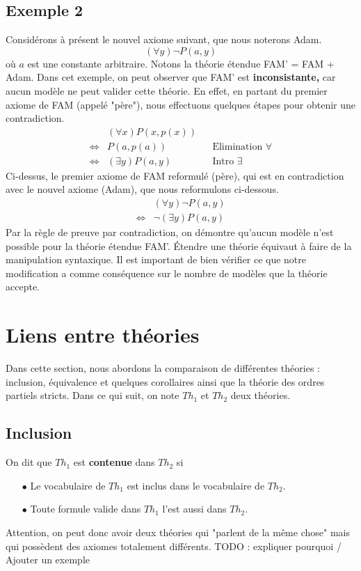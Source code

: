 \subsection*{Exemple 2}
Considérons à présent le nouvel axiome suivant, que nous noterons Adam.
$$ (\forall y) \neg P(a,y) $$
où $a$ est une constante arbitraire. Notons la théorie étendue FAM' = FAM + Adam. Dans cet exemple, on peut observer que FAM' est \textbf{inconsistante,} car aucun modèle ne peut valider cette théorie. En effet, en partant du premier axiome de FAM (appelé "père"), nous effectuons quelques étapes pour obtenir une contradiction.
\begin{align*}
& (\forall x) P(x,p(x)) \\
\Leftrightarrow & P(a,p(a)) && \textrm{Elimination } \forall \\
\Leftrightarrow & (\exists y) P(a,y) && \textrm{Intro } \exists
\end{align*}
Ci-dessus, le premier axiome de FAM reformulé (père), qui est en contradiction avec le nouvel axiome (Adam), que nous reformulons ci-dessous.
\begin{align*}
& (\forall y) \neg P(a,y) \\
\Leftrightarrow & \neg (\exists y) P(a,y)
\end{align*}
Par la règle de preuve par contradiction, on démontre qu'aucun modèle n'est possible pour la théorie étendue FAM'. \'{E}tendre une théorie équivaut à faire de la manipulation syntaxique. Il est important de bien vérifier ce que notre modification a comme conséquence sur le nombre de modèles que la théorie accepte.

\section{Liens entre théories}
Dans cette section, nous abordons la comparaison de différentes théories : inclusion, équivalence et quelques corollaires ainsi que la théorie des ordres partiels stricts. Dans ce qui suit, on note $Th_1$ et $Th_2$ deux théories.

\subsection*{Inclusion}
On dit que $Th_1$ est \textbf{contenue} dans $Th_2$ si
\begin{itemize}
\item[$\bullet$] Le vocabulaire de $Th_1$ est inclus dans le vocabulaire de $Th_2$.
\item[$\bullet$] Toute formule valide dans $Th_1$ l'est aussi dans $Th_2$.
\end{itemize}
Attention, on peut donc avoir deux théories qui "parlent de la même chose" mais qui possèdent des axiomes totalement différents.
TODO : expliquer pourquoi / Ajouter un exemple


